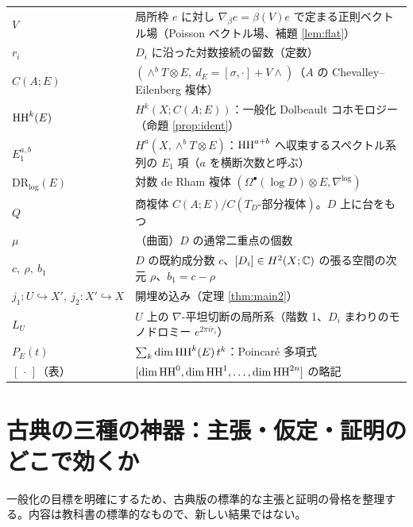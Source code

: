 \begin{longtable}{>{\raggedright\arraybackslash}p{3.4cm}>{\raggedright\arraybackslash}p{11.6cm}}
$V$ & 局所枠 $e$ に対し $\nabla_\beta e=\beta(V)e$ で定まる正則ベクトル場（Poisson ベクトル場、補題 \ref{lem:flat}）\\
$r_i$ & $D_i$ に沿った対数接続の留数（定数）\\
$C(A;E)$ & $(\wedge^bT\otimes E,\ d_E=[\sigma,\cdot]+V\wedge)$（$A$ の Chevalley--Eilenberg 複体）\\
$\mathrm{HH}^k(E)$ & $H^k(X;C(A;E))$：一般化 Dolbeault コホモロジー（命題 \ref{prop:ident}）\\
$E_1^{a,b}$ & $H^a(X,\wedge^bT\otimes E)$：$\mathrm{HH}^{a+b}$ へ収束するスペクトル系列の $E_1$ 項（$a$ を横断次数と呼ぶ）\\
$\mathrm{DR}_{\log}(E)$ & 対数 de Rham 複体 $(\Omega^\bullet(\log D)\otimes E,\nabla^{\log})$\\
$Q$ & 商複体 $C(A;E)/C(T_D\text{-部分複体})$。$D$ 上に台をもつ\\
$\mu$ & （曲面）$D$ の通常二重点の個数\\
$c,\ \rho,\ b_1$ & $D$ の既約成分数 $c$、$[D_i]\in H^2(X;\mathbb C)$ の張る空間の次元 $\rho$、$b_1=c-\rho$\\
$j_1:U\hookrightarrow X',\ j_2:X'\hookrightarrow X$ & 開埋め込み（定理 \ref{thm:main2}）\\
$L_U$ & $U$ 上の $\nabla$-平坦切断の局所系（階数 1、$D_i$ まわりのモノドロミー $e^{2\pi ir_i}$）\\
$P_E(t)$ & $\sum_k\dim\mathrm{HH}^k(E)\,t^k$：Poincaré 多項式\\
$[\,\cdot\,]$（表） & $[\dim\mathrm{HH}^0,\dim\mathrm{HH}^1,\dots,\dim\mathrm{HH}^{2n}]$ の略記\\
\bottomrule
\end{longtable}

\section{古典の三種の神器：主張・仮定・証明のどこで効くか}\label{sec:classical}
一般化の目標を明確にするため、古典版の標準的な主張と証明の骨格を整理する。内容は教科書の標準的なもので、新しい結果ではない。

